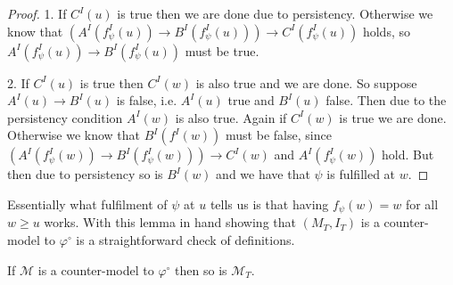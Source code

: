 \documentclass[a4paper,UKenglish,cleveref, autoref, thm-restate]{lipics-v2021}
\begin{document}
\begin{proof}
	1. If $C^I(u)$ is true then we are done due to persistency. Otherwise we know that $(A^I(f_\psi^I(u))\to B^I(f_\psi^I(u)))\to C^I(f_\psi^I(u))$ holds, so $A^I(f_\psi^I(u))\to B^I(f_\psi^I(u))$ must be true.
	
	2. If $C^I(u)$ is true then $C^I(w)$ is also true and we are done. So suppose $A^I(u)\to B^I(u)$ is false, i.e. $A^I(u)$ true and $B^I(u)$ false. Then due to the persistency condition $A^I(w)$ is also true. Again if $C^I(w)$ is true we are done. Otherwise we know that $B^I(f^I(w))$ must be false, since $(A^I(f^I_\psi(w))\to B^I(f^I_\psi(w)))\to C^I(w)$ and $A^I(f^I_\psi(w))$ hold. But then due to persistency so is $B^I(w)$ and we have that $\psi$ is fulfilled at $w$.
\end{proof}

Essentially what fulfilment of $\psi$ at $u$ tells us is that having $f_\psi(w) = w$ for all $w\geq u$ works.
With this lemma in hand showing that $(M_T, I_T)$ is a counter-model to $\varphi^\circ$ is a straightforward check of definitions.

\begin{corollary}
	If $\mathcal M$ is a counter-model to $\varphi^\circ$ then so is $\mathcal M_T$.
\end{corollary}
\end{document}
